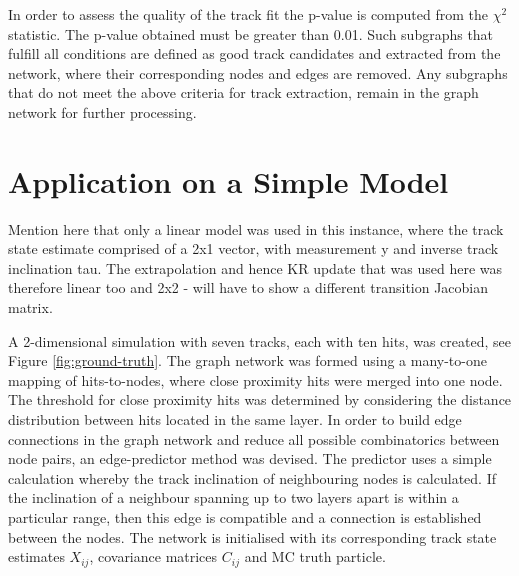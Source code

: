 In order to assess the quality of the track fit the p-value is computed from the $\chi^2$ statistic. The p-value obtained must be greater than 0.01. Such subgraphs that fulfill all conditions are defined as good track candidates and extracted from the network, where their corresponding nodes and edges are removed. Any subgraphs that do not meet the above criteria for track extraction, remain in the graph network for further processing.





\section{Application on a Simple Model}
\label{gnn-application-toy-model}

Mention here that only a linear model was used in this instance, where the track state estimate comprised of a 2x1 vector, with measurement y and inverse track inclination tau. The extrapolation and hence KR update that was used here was therefore linear too and 2x2 - will have to show a different transition Jacobian matrix.





A 2-dimensional simulation with seven tracks, each with ten hits, was created, see Figure \ref{fig:ground-truth}. The graph network was formed using a many-to-one mapping of hits-to-nodes, where close proximity hits were merged into one node. The threshold for close proximity hits was determined by considering the distance distribution between hits located in the same layer. In order to build edge connections in the graph network and reduce all possible combinatorics between node pairs, an edge-predictor method was devised. The predictor uses a simple calculation whereby the track inclination of neighbouring nodes is calculated. If the inclination of a neighbour spanning up to two layers apart is within a particular range, then this edge is compatible and a connection is established between the nodes. The network is initialised with its corresponding track state estimates $X_{ij}$, covariance matrices $C_{ij}$ and MC truth particle.

